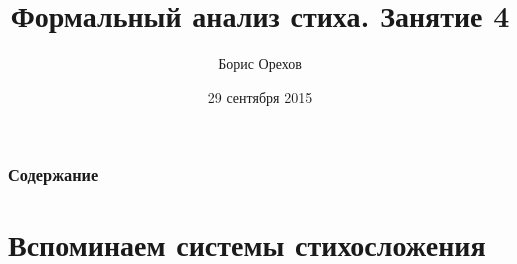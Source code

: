 \documentclass{beamer}
\title[Занятие 4]{Формальный анализ стиха. Занятие 4} %
\author{Борис Орехов} %
\institute[НИУ ВШЭ] %
{
НИУ Высшая школа экономики \\ %
\medskip
\textit{nevmenandr@gmail.com} %
}
\date{29 сентября 2015} %
\begin{document}
\begin{frame}
\titlepage %
\end{frame}



\begin{frame}
\frametitle{Содержание}  %
\tableofcontents %
\end{frame}




\section{Вспоминаем системы стихосложения}\label{sec:sys} %
\end{document}
